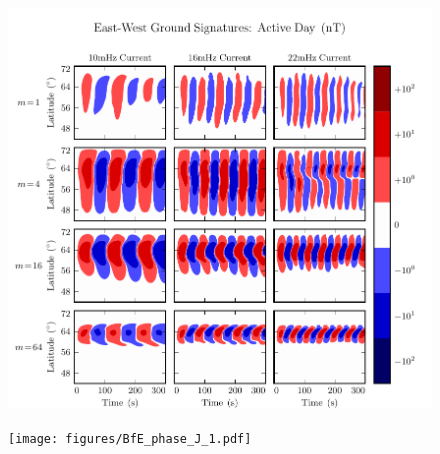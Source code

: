 \begin{figure}[H]
    \centering
    \includegraphics[width=\textwidth]{figures/BfE_J_1.pdf}
    \caption[East-West Ground Signatures: Active Day]{}
    \label{fig_BfE_J_1}
\end{figure}

\begin{figure}[H]
    \centering
    \texttt{[image: figures/BfE\_phase\_J\_1.pdf]}
    \caption[East-West Ground Signature Phases: Active Day]{}
    \label{fig_BfE_phase_J_1}
\end{figure}









